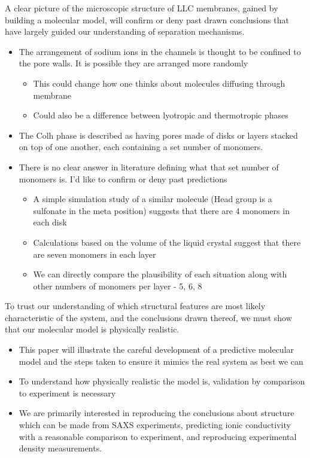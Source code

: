 \documentclass{article}
\begin{document}
	A clear picture of the microscopic structure of LLC membranes, gained by building a molecular model, will confirm or deny past drawn conclusions that have largely guided our understanding of separation mechanisms. 
	\begin{itemize}
		\item The arrangement of sodium ions in the channels is thought to be confined to the pore walls. It is possible they are arranged more randomly
		\begin{itemize}
			\item This could change how one thinks about molecules diffusing through membrane
			\item Could also be a difference between lyotropic and thermotropic phases
		\end{itemize}
		\item The Colh phase is described as having pores made of disks or layers stacked on top of one another, each containing a set number of monomers. 
		\item There is no clear answer in literature defining what that set number of monomers is. I'd like to confirm or deny past predictions
		\begin{itemize}
			\item A simple simulation study of a similar molecule (Head group is a sulfonate in the meta position) suggests that there are 4 monomers in each disk
			\item Calculations based on the volume of the liquid crystal suggest that there are seven monomers in each layer
			\item We can directly compare the plausibility of each situation along with other numbers of monomers per layer - 5, 6, 8
		\end{itemize}
	\end{itemize}
	
	To trust our understanding of which structural features are most likely characteristic of the system, and the conclusions drawn thereof, we must show that our molecular model is physically realistic.   
	\begin{itemize}
		\item This paper will illustrate the careful development of a predictive molecular model and the steps taken to ensure it mimics the real system as best we can 
		\item To understand how physically realistic the model is, validation by comparison to experiment is necessary
		\item We are primarily interested in reproducing the conclusions about structure which can be made from SAXS experiments, predicting ionic conductivity with a reasonable comparison to experiment, and reproducing experimental density measurements.          
	\end{itemize}
	
\end{document}
